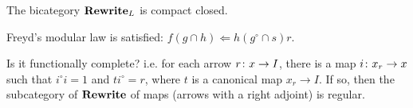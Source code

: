 \documentclass[master]{subfiles}
\begin{document}
\begin{cor} \label{thm_nlr_bi-rewrite-isCompClosed}
	The bicategory $ \mathbf{Rewrite}_L$ is compact closed.
\end{cor}

\begin{cor} \label{thm_nlr_bi-rewrite-freyds-modular}
	Freyd's modular law is satisfied: $ f (g \cap h) \Leftarrow h ( g^\circ \cap s ) r $.
\end{cor} 

\begin{cor} \label{thm_nlr_bi-rewrite-isFunctCompl}
	Is it functionally complete? i.e. for each arrow $ r \colon x \to I $, there is a map $ i \colon x_r \to x $ such that $ i^\circ i = 1 $ and $ t i^\circ = r $, where $ t $ is a canonical map $ x_r \to I $. If so, then the subcategory of $ \mathbf{Rewrite} $ of maps (arrows with a right adjoint) is regular.
\end{cor}
\end{document}
